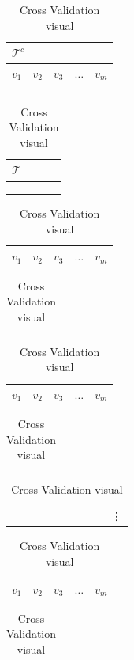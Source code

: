 \documentclass[a4paper]{article}
\begin{document}
\begin{table}
\caption{Cross Validation visual}\label{CV:1}
\begin{tabular}{lllll}
\multicolumn{5}{l}{$\mathcal{T}^c$}                                                                                                   \\ \hline
\multicolumn{1}{|l|}{$v_1$} & \multicolumn{1}{l|}{$v_2$} & \multicolumn{1}{l|}{$v_3$} & \multicolumn{1}{l|}{$\dots$} & \multicolumn{1}{l|}{$v_m$} \\ \hline
                       &                       &                       &                       &                       \\
                       &                       &                       &                       &                      
\end{tabular}
\begin{tabular}{lllll}
\multicolumn{5}{l}{$\mathcal{T}$}   \\ \hline
\multicolumn{5}{|l|}{} \\ \hline
    &     &    &   &   \\
    &     &    &   &  
\end{tabular}
\newline\begin{tabular}{lllll}
\hline
\multicolumn{1}{|l|}{\cellcolor[HTML]{F8FF00}$v_1$} & \multicolumn{1}{l|}{$v_2$} & \multicolumn{1}{l|}{$v_3$} & \multicolumn{1}{l|}{$\dots$} & \multicolumn{1}{l|}{$v_m$} \\ \hline  
\end{tabular}
\begin{tabular}{|lllll|}
\hline
 &  &  &  &  \\ \hline
\end{tabular}
\newline\begin{tabular}{lllll}
\hline
\multicolumn{1}{|l|}{$v_1$} & \multicolumn{1}{l|}{\cellcolor[HTML]{F8FF00}$v_2$} & \multicolumn{1}{l|}{$v_3$} & \multicolumn{1}{l|}{$\dots$} & \multicolumn{1}{l|}{$v_m$} \\ \hline     
\end{tabular}
\begin{tabular}{|lllll|}
\hline
 &  &  &  &  \\ \hline
\end{tabular}
\newline \begin{tabular}{llllllllll}
 &  &  &  &  &  &  &  &  & \vdots
\end{tabular}
\newline\begin{tabular}{lllll}
\hline
\multicolumn{1}{|l|}{$v_1$} & \multicolumn{1}{l|}{$v_2$} & \multicolumn{1}{l|}{$v_3$} & \multicolumn{1}{l|}{$\dots$} & \multicolumn{1}{l|}{\cellcolor[HTML]{F8FF00}$v_m$} \\ \hline \end{tabular}
\begin{tabular}{|lllll|}
\hline
 &  &  &  &  \\ \hline
\end{tabular}
\end{table} 
\end{document}
